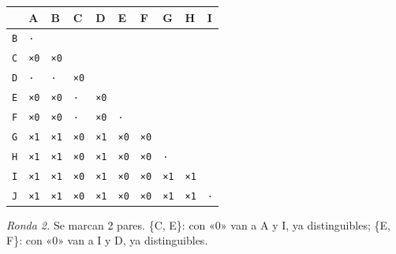 \documentclass[11pt]{article}
\begin{document}
\begin{center}\footnotesize\begin{tabular}{llllllllll}\toprule
 & A & B & C & D & E & F & G & H & I \\\midrule
\texttt{B} & \texttt{·} & \texttt{} & \texttt{} & \texttt{} & \texttt{} & \texttt{} & \texttt{} & \texttt{} & \texttt{} \\
\texttt{C} & \texttt{×0} & \texttt{×0} & \texttt{} & \texttt{} & \texttt{} & \texttt{} & \texttt{} & \texttt{} & \texttt{} \\
\texttt{D} & \texttt{·} & \texttt{·} & \texttt{×0} & \texttt{} & \texttt{} & \texttt{} & \texttt{} & \texttt{} & \texttt{} \\
\texttt{E} & \texttt{×0} & \texttt{×0} & \texttt{·} & \texttt{×0} & \texttt{} & \texttt{} & \texttt{} & \texttt{} & \texttt{} \\
\texttt{F} & \texttt{×0} & \texttt{×0} & \texttt{·} & \texttt{×0} & \texttt{·} & \texttt{} & \texttt{} & \texttt{} & \texttt{} \\
\texttt{G} & \texttt{×1} & \texttt{×1} & \texttt{×0} & \texttt{×1} & \texttt{×0} & \texttt{×0} & \texttt{} & \texttt{} & \texttt{} \\
\texttt{H} & \texttt{×1} & \texttt{×1} & \texttt{×0} & \texttt{×1} & \texttt{×0} & \texttt{×0} & \texttt{·} & \texttt{} & \texttt{} \\
\texttt{I} & \texttt{×1} & \texttt{×1} & \texttt{×0} & \texttt{×1} & \texttt{×0} & \texttt{×0} & \texttt{×1} & \texttt{×1} & \texttt{} \\
\texttt{J} & \texttt{×1} & \texttt{×1} & \texttt{×0} & \texttt{×1} & \texttt{×0} & \texttt{×0} & \texttt{×1} & \texttt{×1} & \texttt{·} \\
\bottomrule\end{tabular}\end{center}
\textit{Ronda 2.} Se marcan 2 pares. \{C, E\}: con «0» van a A y I, ya distinguibles; \{E, F\}: con «0» van a I y D, ya distinguibles.
\end{document}

